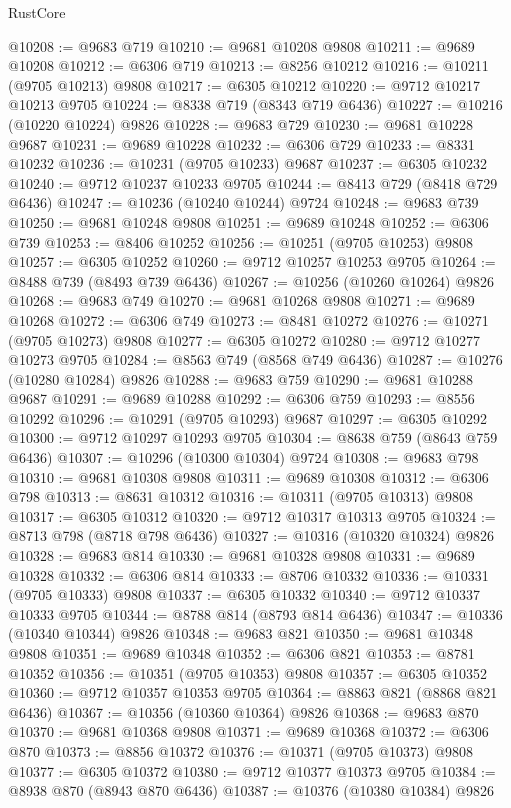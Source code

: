 \begin{lexlean}{RustCore}
\begin{coremodule}
@10208 := @9683 @719
@10210 := @9681 @10208 @9808
@10211 := @9689 @10208
@10212 := @6306 @719
@10213 := @8256 @10212
@10216 := @10211 (@9705 @10213) @9808
@10217 := @6305 @10212
@10220 := @9712 @10217 @10213 @9705
@10224 := @8338 @719 (@8343 @719 @6436)
@10227 := @10216 (@10220 @10224) @9826
@10228 := @9683 @729
@10230 := @9681 @10228 @9687
@10231 := @9689 @10228
@10232 := @6306 @729
@10233 := @8331 @10232
@10236 := @10231 (@9705 @10233) @9687
@10237 := @6305 @10232
@10240 := @9712 @10237 @10233 @9705
@10244 := @8413 @729 (@8418 @729 @6436)
@10247 := @10236 (@10240 @10244) @9724
@10248 := @9683 @739
@10250 := @9681 @10248 @9808
@10251 := @9689 @10248
@10252 := @6306 @739
@10253 := @8406 @10252
@10256 := @10251 (@9705 @10253) @9808
@10257 := @6305 @10252
@10260 := @9712 @10257 @10253 @9705
@10264 := @8488 @739 (@8493 @739 @6436)
@10267 := @10256 (@10260 @10264) @9826
@10268 := @9683 @749
@10270 := @9681 @10268 @9808
@10271 := @9689 @10268
@10272 := @6306 @749
@10273 := @8481 @10272
@10276 := @10271 (@9705 @10273) @9808
@10277 := @6305 @10272
@10280 := @9712 @10277 @10273 @9705
@10284 := @8563 @749 (@8568 @749 @6436)
@10287 := @10276 (@10280 @10284) @9826
@10288 := @9683 @759
@10290 := @9681 @10288 @9687
@10291 := @9689 @10288
@10292 := @6306 @759
@10293 := @8556 @10292
@10296 := @10291 (@9705 @10293) @9687
@10297 := @6305 @10292
@10300 := @9712 @10297 @10293 @9705
@10304 := @8638 @759 (@8643 @759 @6436)
@10307 := @10296 (@10300 @10304) @9724
@10308 := @9683 @798
@10310 := @9681 @10308 @9808
@10311 := @9689 @10308
@10312 := @6306 @798
@10313 := @8631 @10312
@10316 := @10311 (@9705 @10313) @9808
@10317 := @6305 @10312
@10320 := @9712 @10317 @10313 @9705
@10324 := @8713 @798 (@8718 @798 @6436)
@10327 := @10316 (@10320 @10324) @9826
@10328 := @9683 @814
@10330 := @9681 @10328 @9808
@10331 := @9689 @10328
@10332 := @6306 @814
@10333 := @8706 @10332
@10336 := @10331 (@9705 @10333) @9808
@10337 := @6305 @10332
@10340 := @9712 @10337 @10333 @9705
@10344 := @8788 @814 (@8793 @814 @6436)
@10347 := @10336 (@10340 @10344) @9826
@10348 := @9683 @821
@10350 := @9681 @10348 @9808
@10351 := @9689 @10348
@10352 := @6306 @821
@10353 := @8781 @10352
@10356 := @10351 (@9705 @10353) @9808
@10357 := @6305 @10352
@10360 := @9712 @10357 @10353 @9705
@10364 := @8863 @821 (@8868 @821 @6436)
@10367 := @10356 (@10360 @10364) @9826
@10368 := @9683 @870
@10370 := @9681 @10368 @9808
@10371 := @9689 @10368
@10372 := @6306 @870
@10373 := @8856 @10372
@10376 := @10371 (@9705 @10373) @9808
@10377 := @6305 @10372
@10380 := @9712 @10377 @10373 @9705
@10384 := @8938 @870 (@8943 @870 @6436)
@10387 := @10376 (@10380 @10384) @9826

\end{coremodule}
\end{lexlean}
